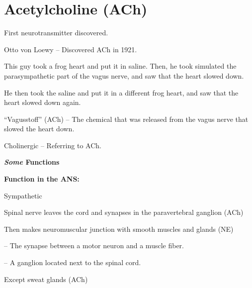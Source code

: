 \section{Acetylcholine (ACh)}

\begin{coloredlist}
    \item First neurotransmitter discovered.
    \begin{coloredlist}
        \item Otto von Loewy -- Discovered ACh in 1921.
        \begin{coloredlist}
            \item This guy took a frog heart and put it in saline. Then, he took simulated the parasympathetic part of the vagus nerve, and saw that the heart slowed down.
            \item He then took the saline and put it in a different frog heart, and saw that the heart slowed down again.
            \item ``Vagusstoff'' (ACh) -- The chemical that was released from the vagus nerve that slowed the heart down.
            \item Cholinergic -- Referring to ACh.
        \end{coloredlist}
    \end{coloredlist}
    \item \textbf{\textit{Some} Functions}
    \begin{coloredlist}
        \item \textbf{Function in the ANS:}
        \begin{coloredlist}
            \item Sympathetic
            \begin{coloredlist}
                \item Spinal nerve leaves the cord and synapses in the paravertebral ganglion (ACh)
                \item Then makes neuromuscular junction with smooth muscles and glands (NE)
                \begin{coloredlist}
                    \item {} -- The synapse between a motor neuron and a muscle fiber.
                    \item {} -- A ganglion located next to the spinal cord.
                \end{coloredlist}
                \begin{coloredlist}
                    \item Except sweat glands (ACh)

\end{coloredlist}
\end{coloredlist}
\end{coloredlist}
\end{coloredlist}
\end{coloredlist}
